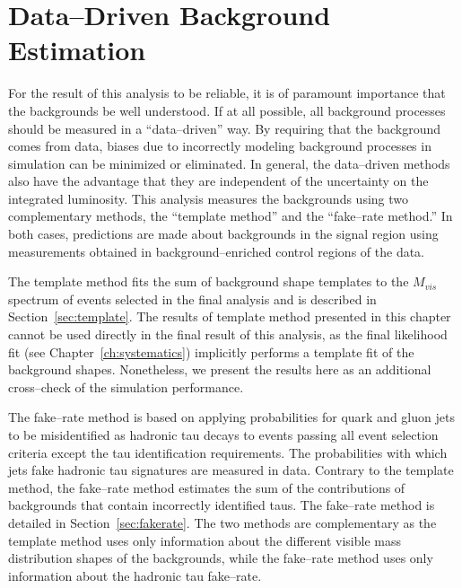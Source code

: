 \ifx\master\undefined\fi
\newcommand{\tablesize}{\small} \chapter{Data--Driven Background Estimation}
\label{ch:backgrounds}
%
For the result of this analysis to be reliable, it is of paramount importance
that the backgrounds be well understood.  If at all possible, all background
processes should be measured in a ``data--driven'' way.  By requiring that the
background comes from data, biases due to incorrectly modeling background
processes in simulation can be minimized or eliminated.  In general, the
data--driven methods also have the advantage that they are independent of the
uncertainty on the integrated luminosity.  This analysis measures the
backgrounds using two complementary methods, the ``template method'' and the
``fake--rate method.'' In both cases, predictions are made about backgrounds in
the signal region using measurements obtained in background--enriched control
regions of the data. 

The template method fits the sum of background shape templates  to the $M_{vis}$
spectrum of events selected in the final analysis and is described in
Section~\ref{sec:template}.  The results of template method presented in this
chapter cannot be used directly in the final result of this analysis, as the
final likelihood fit (see Chapter~\ref{ch:systematics}) implicitly performs a
template fit of the background shapes.  Nonetheless, we present the results here
as an additional cross--check of the simulation performance.

The fake--rate method is based on applying probabilities for quark and gluon
jets to be misidentified as hadronic tau decays to events passing all event
selection criteria except the tau identification requirements.  The
probabilities with which jets fake hadronic tau signatures are measured in data.
Contrary to the template method, the fake--rate method estimates the sum of the
contributions of backgrounds that contain incorrectly identified taus.  The
fake--rate method is detailed in Section~\ref{sec:fakerate}.  The two methods
are complementary as the template method uses only information about the
different visible mass distribution shapes of the backgrounds, while the
fake--rate method uses only information about the hadronic tau fake--rate.

